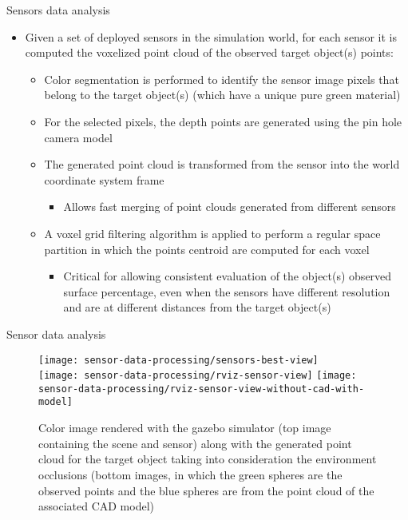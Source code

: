 \begin{frame}{Sensors data analysis}
	\begin{itemize}
		\item Given a set of deployed sensors in the simulation world, for each sensor it is computed the voxelized point cloud of the observed target object(s) points:
		\begin{itemize}
			\item Color segmentation is performed to identify the sensor image pixels that belong to the target object(s) (which have a unique pure green material)
			\item For the selected pixels, the depth points are generated using the pin hole camera model
			\item The generated point cloud is transformed from the sensor into the world coordinate system frame
			\begin{itemize}
				\item Allows fast merging of point clouds generated from different sensors
			\end{itemize}
			\item A voxel grid filtering algorithm is applied to perform a regular space partition in which the points centroid are computed for each voxel
			\begin{itemize}
				\item Critical for allowing consistent evaluation of the object(s) observed surface percentage, even when the sensors have different resolution and are at different distances from the target object(s)
			\end{itemize}
		\end{itemize}
	\end{itemize}
\end{frame}


\begin{frame}{Sensor data analysis}
	\begin{figure}
		\centering
		\texttt{[image: sensor-data-processing/sensors-best-view]}\\
		\vspace{0.5em}
		\texttt{[image: sensor-data-processing/rviz-sensor-view]}
		\texttt{[image: sensor-data-processing/rviz-sensor-view-without-cad-with-model]}
		\caption{Color image rendered with the gazebo simulator (top image containing the scene and sensor) along with the generated point cloud for the target object taking into consideration the environment occlusions (bottom images, in which the green spheres are the observed points and the blue spheres are from the point cloud of the associated CAD model)}
	\end{figure}
\end{frame}


